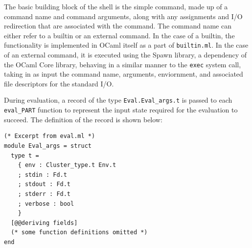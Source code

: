 \documentclass[twoside]{report}
\begin{document}


The basic building block of the shell is the simple command, made up of a command name and command arguments, along with any assignments and I/O redirection that are associated with the command.
The command name can either refer to a builtin or an external command.
In the case of a builtin, the functionality is implemented in OCaml itself as a part of \texttt{builtin.ml}.
In the case of an external command, it is executed using the Spawn library, a dependency of the OCaml Core library, behaving in a similar manner to the \texttt{exec} system call, taking in as input the command name, arguments, enviornment, and associated file descriptors for the standard I/O.

During evaluation, a record of the type \texttt{Eval.Eval\_args.t} is passed to each \texttt{eval\_PART} function to represent the input state required for the evaluation to succeed. The definition of the record is shown below:

\begin{minipage}[c]{\textwidth-15pt}
  \begin{lstlisting}
(* Excerpt from eval.ml *)
module Eval_args = struct
  type t =
    { env : Cluster_type.t Env.t
    ; stdin : Fd.t
    ; stdout : Fd.t
    ; stderr : Fd.t
    ; verbose : bool
    }
  [@@deriving fields]
  (* some function definitions omitted *)
end
\end{lstlisting}
  \smallskip
\end{minipage}
\end{document}
